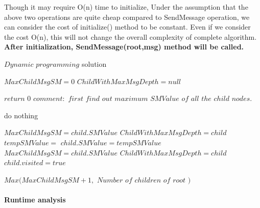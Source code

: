 Though it may require O(n) time to initialize, Under the assumption that the above two operations are quite cheap compared to SendMessage operation, we can consider the cost of initialize() method to be constant. Even if we consider the cost O(n), this will not change the overall complexity of complete algorithm. \\

\textbf{After initialization, SendMessage(root,msg) method will be called. }




\begin{algorithm}
	\caption{$Dynamic $ $programming$ solution}
	\begin{algorithmic}
		\State $ MaxChildMsgSM = 0 $
		\State $ ChildWithMaxMsgDepth = null $
		
			\State $ return$ $ 0$ 	
		\EndIf
	  	\State 		
		\State $comment: $ $ first $ $ find $ $ out $ $ maximum $ $ SMValue $  $ of $ $ all $ $ the $ $ child $ $ nodes.$		
		
		
		\State 
			\State do nothing
		\Else
		\State		
		
			 \State			 
				\State			 	
			 	\State $ MaxChildMsgSM = child.SMValue$
				\State $ ChildWithMaxMsgDepth = child $
			  \EndIf
				\State
	     \Else
	     \State
		    \State 	
	     	\State $tempSMValue =  $ 
	     	\State $child.SMValue = tempSMValue$
				\State			 	
			 	\State $ MaxChildMsgSM = child.SMValue$
				\State $ ChildWithMaxMsgDepth = child $
				\State $ child.visited = true $
				\State
			\EndIf
			\State
		\EndIf		
		\State
		\EndIf
		\State
		\EndIf
		\State	
		\EndFor
		
		
		
		\Return $ Max(MaxChildMsgSM + 1,$ $ Number$ $ of $ $ children $ $ of $ $ root $ $ ) $
			 				
		
		
	  \EndFunction
	
	  
	\end{algorithmic}
\end{algorithm}

\paragraph{Runtime analysis}

